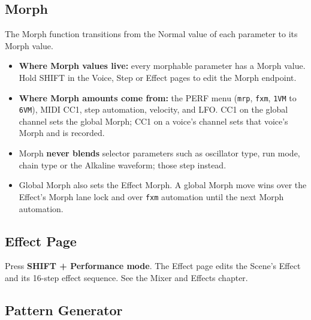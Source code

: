 \subsection{Morph}\label{morph}

The Morph function transitions from the Normal value of each parameter
to its Morph value.

\begin{itemize}
\tightlist
\item
  \textbf{Where Morph values live:} every morphable parameter has a
  Morph value. Hold SHIFT in the Voice, Step or Effect pages to edit the
  Morph endpoint.
\item
  \textbf{Where Morph amounts come from:} the PERF menu (\texttt{mrp},
  \texttt{fxm}, \texttt{1VM} to \texttt{6VM}), MIDI CC1, step
  automation, velocity, and LFO. CC1 on the global channel sets the
  global Morph; CC1 on a voice's channel sets that voice's Morph and is
  recorded.
\item
  Morph \textbf{never blends} selector parameters such as oscillator
  type, run mode, chain type or the Alkaline waveform; those step
  instead.
\item
  Global Morph also sets the Effect Morph. A global Morph move wins over
  the Effect's Morph lane lock and over \texttt{fxm} automation until
  the next Morph automation.
\end{itemize}

\subsection{Effect Page}\label{effect-page}

Press \textbf{SHIFT + Performance mode}. The Effect page edits the
Scene's Effect and its 16-step effect sequence. See the Mixer and
Effects chapter.

\subsection{Pattern Generator}\label{pattern-generator}


